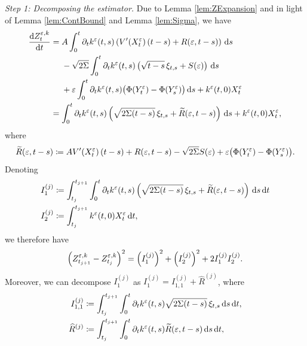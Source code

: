 \documentclass[10pt]{article}
\begin{document}
\textit{Step 1: Decomposing the estimator.} Due to Lemma \ref{lem:ZExpansion} and in light of Lemma \ref{lem:ContBound} and Lemma \ref{lem:Sigma}, we have
\begin{equation}
\begin{aligned}
	\frac{\mathrm{d} Z^{\varepsilon,k}_t}{\mathrm{d} t} &= 
	\begin{aligned}[t] 
	&A \int_0^t \partial_t k^\varepsilon(t, s) \left( V'(X^\varepsilon_t)\,(t-s) + R(\varepsilon, t-s)\right) \,\mathrm{d} s  \\
	&-\sqrt{2\Sigma} \int_0^t \partial_t k^\varepsilon(t, s) \left( \sqrt{t-s} \, \xi_{t,s} + S(\varepsilon) \right)\,\mathrm{d} s\\
	&+ \varepsilon \int_0^t \partial_t k^\varepsilon(t, s) \big(\Phi(Y^\varepsilon_t)- \Phi(Y^\varepsilon_s)\big) \,\mathrm{d} s + k^\varepsilon(t, 0) X^\varepsilon_t
	\end{aligned}
	\\
	&= \int_0^t \partial_t k^\varepsilon(t, s)\left(\sqrt{2\Sigma(t-s)} \, \xi_{t,s} + \widetilde R(\varepsilon, t - s)\right) \,\mathrm{d} s + k^\varepsilon(t, 0) X^\varepsilon_t,
\end{aligned}
\end{equation}
where
\begin{equation}
	\widetilde R(\varepsilon, t - s) \coloneqq AV'(X^\varepsilon_t)\,(t-s) + R(\varepsilon, t-s) - \sqrt{2\Sigma} S(\varepsilon) + \varepsilon \big(\Phi(Y^\varepsilon_t)- \Phi(Y^\varepsilon_s)\big).
\end{equation}
Denoting
\begin{equation}
\begin{aligned}
	I_1^{(j)} &\coloneqq \int_{t_j}^{t_{j+1}}\int_0^t \partial_t k^\varepsilon(t, s)\left(\sqrt{2\Sigma(t-s)} \, \xi_{t,s} + \widetilde R(\varepsilon, t - s)\right) \,\mathrm{d} s \,\mathrm{d} t\\
	I_2^{(j)} &\coloneqq \int_{t_j}^{t_{j+1}} k^\varepsilon(t, 0) X^\varepsilon_t \,\mathrm{d} t,
\end{aligned}
\end{equation}
we therefore have
\begin{equation}
	\left(Z^{\varepsilon,k}_{t_{j+1}} - Z^{\varepsilon,k}_{t_j}\right)^2 = \left(I_1^{(j)}\right)^2 + \left(I_2^{(j)}\right)^2 + 2I_1^{(j)}I_2^{(j)}.
\end{equation}
Moreover, we can decompose $I_1^{(j)}$ as $I_1^{(j)} = I_{1,1}^{(j)} + \widehat R^{(j)}$, where
\begin{equation}	
\begin{aligned}
	I_{1,1}^{(j)} &\coloneqq \int_{t_j}^{t_{j+1}}\int_0^t \partial_t k^\varepsilon(t, s)\sqrt{2\Sigma(t-s)} \, \xi_{t,s} \,\mathrm{d} s \,\mathrm{d} t, \\
	\widehat R^{(j)} &\coloneqq \int_{t_j}^{t_{j+1}}\int_0^t \partial_t k^\varepsilon(t, s)\widetilde R(\varepsilon, t - s)\,\mathrm{d} s \,\mathrm{d} t,
\end{aligned}
\end{equation}
\end{document}

